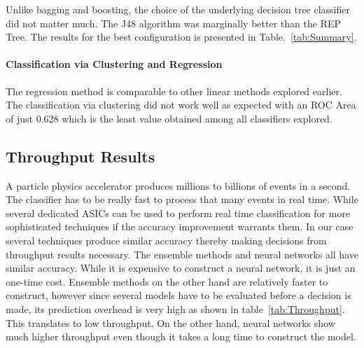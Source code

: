 Unlike bagging and boosting, the choice of the underlying decision tree classifier did not matter much. The J48 algorithm was marginally better than the REP Tree. The results for the best configuration is presented in Table.~\ref{tab:Summary}.

\paragraph{Classification via Clustering and Regression}
The regression method is comparable to other linear methods explored earlier. The classification via clustering did not work well as expected with an ROC Area of just 0.628 which is the least value obtained among all classifiers explored.


\subsection{Throughput Results}

A particle physics accelerator produces millions to billions of events in a second. The classifier has to be really fast to process that many events in real time. While several dedicated ASICs can be used to perform real time classification for more sophisticated techniques if the accuracy improvement warrants them. In our case several techniques produce similar accuracy thereby making decisions from throughput results necessary. The ensemble methods and neural networks all have similar accuracy. While it is expensive to construct a neural network, it is just an one-time cost. Ensemble methods on the other hand are relatively faster to construct, however since several models have to be evaluated before a decision is made, its prediction overhead is very high as shown in table~\ref{tab:Throughput}. This translates to low throughput. On the other hand, neural networks show much higher throughput even though it takes a long time to construct the model.


